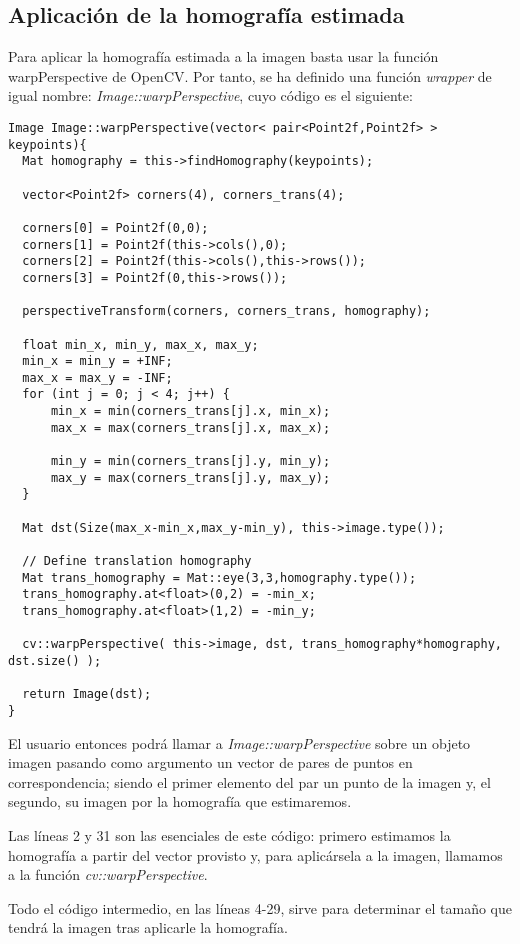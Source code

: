 \documentclass[a4paper, 11pt]{article}
\theoremstyle{definition}
\theoremstyle{theorem}
\begin{document}
  \subsection{Aplicación de la homografía estimada}
  Para aplicar la homografía estimada a la imagen basta usar la función warpPerspective de OpenCV. Por tanto, se ha definido una función \emph{wrapper} de igual nombre: \emph{Image::warpPerspective}, cuyo código es el siguiente:
  \begin{lstlisting}
Image Image::warpPerspective(vector< pair<Point2f,Point2f> > keypoints){
  Mat homography = this->findHomography(keypoints);

  vector<Point2f> corners(4), corners_trans(4);

  corners[0] = Point2f(0,0);
  corners[1] = Point2f(this->cols(),0);
  corners[2] = Point2f(this->cols(),this->rows());
  corners[3] = Point2f(0,this->rows());

  perspectiveTransform(corners, corners_trans, homography);

  float min_x, min_y, max_x, max_y;
  min_x = min_y = +INF;
  max_x = max_y = -INF;
  for (int j = 0; j < 4; j++) {
      min_x = min(corners_trans[j].x, min_x);
      max_x = max(corners_trans[j].x, max_x);

      min_y = min(corners_trans[j].y, min_y);
      max_y = max(corners_trans[j].y, max_y);
  }

  Mat dst(Size(max_x-min_x,max_y-min_y), this->image.type());

  // Define translation homography
  Mat trans_homography = Mat::eye(3,3,homography.type());
  trans_homography.at<float>(0,2) = -min_x;
  trans_homography.at<float>(1,2) = -min_y;

  cv::warpPerspective( this->image, dst, trans_homography*homography, dst.size() );

  return Image(dst);
}
  \end{lstlisting}

  El usuario entonces podrá llamar a \emph{Image::warpPerspective} sobre un objeto imagen pasando como argumento un vector de pares de puntos en correspondencia; siendo el primer elemento del par un punto de la imagen y, el segundo, su imagen por la homografía que estimaremos.

  Las líneas 2 y 31 son las esenciales de este código: primero estimamos la homografía a partir del vector provisto y, para aplicársela a la imagen, llamamos a la función \emph{cv::warpPerspective}.

  Todo el código intermedio, en las líneas 4-29, sirve para determinar el tamaño que tendrá la imagen tras aplicarle la homografía.
\end{document}
